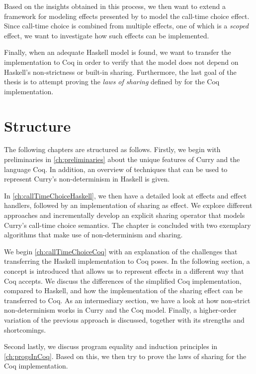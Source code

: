 \documentclass[a4paper, 11pt, fleqn, twoside, abstract=on]{scrreprt}
\begin{document}
Based on the insights obtained in this process, we then want to extend a framework for modeling effects presented by \citet{wu2014effect} to model the call-time choice effect.
Since call-time choice is combined from multiple effects, one of which is a \textit{scoped} effect, we want to investigate how such effects can be implemented.

Finally, when an adequate Haskell model is found, we want to transfer the implementation to Coq in order to verify that the model does not depend on Haskell's non-strictness or built-in sharing.
Furthermore, the last goal of the thesis is to attempt proving the \textit{laws of sharing} defined by \citet{fischer2009purely} for the Coq implementation.

\section{Structure}

The following chapters are structured as follows.
Firstly, we begin with preliminaries in \autoref{ch:preliminaries} about the unique features of Curry and the language Coq.
In addition, an overview of techniques that can be used to represent Curry's non-determinism in Haskell is given.

In \autoref{ch:callTimeChoiceHaskell}, we then have a detailed look at effects and effect handlers, followed by an implementation of sharing as effect.
We explore different approaches and incrementally develop an explicit sharing operator that models Curry's call-time choice semantics.
The chapter is concluded with two exemplary algorithms that make use of non-determinism and sharing.

We begin \autoref{ch:callTimeChoiceCoq} with an explanation of the challenges that transferring the Haskell implementation to Coq poses.
In the following section, a concept is introduced that allows us to represent effects in a different way that Coq accepts.
We discuss the differences of the simplified Coq implementation, compared to Haskell, and how the implementation of the sharing effect can be transferred to Coq.
As an intermediary section, we have a look at how non-strict non-determinism works in Curry and the Coq model.
Finally, a higher-order variation of the previous approach is discussed, together with its strengths and shortcomings.

Second lastly, we discuss program equality and induction principles in  \autoref{ch:progsInCoq}.
Based on this, we then try to prove the laws of sharing for the Coq implementation.
\end{document}
